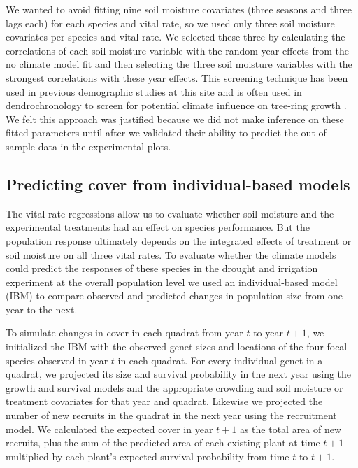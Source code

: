 \documentclass[11pt]{article}
\begin{document}
\begin{doublespace}
We wanted to avoid fitting nine soil moisture covariates (three seasons and three lags each) for each species and vital rate, so we used only three soil moisture covariates per species and vital rate. We selected these three by calculating the correlations of each soil moisture variable with the random year effects from the no climate model fit and then selecting the three soil moisture variables with the strongest correlations with these year effects. This screening technique has been used in previous demographic studies at this site \citep{dalgleish_climate_2010} and is often used in dendrochronology to screen for potential climate influence on tree-ring growth \citep{wang_temporal_2003}. We felt this approach was justified because we did not make inference on these fitted parameters until after we validated their ability to predict the out of sample data in the experimental plots. 

\subsection*{Predicting cover from individual-based models}

The vital rate regressions allow us to evaluate whether soil moisture and the experimental treatments had an effect on species performance. But the population response ultimately depends on the integrated effects of treatment or soil moisture on all three vital rates.  To evaluate whether the climate models could predict the responses of these species in the drought and irrigation experiment at the overall population level we used an individual-based model (IBM) to compare observed and predicted changes in population size from one year to the next. 

To simulate changes in cover in each quadrat from year $t$ to year $t+1$, we initialized the IBM with the observed genet sizes and locations of the four focal species observed in year $t$ in each quadrat. For every individual genet in a quadrat, we projected its size and survival probability in the next year using the growth and survival models and the appropriate crowding and soil moisture or treatment covariates for that year and quadrat.  Likewise we projected the number of new recruits in the quadrat in the next year using the recruitment model. We calculated the expected cover in year $t+1$ as the total area of new recruits, plus the sum of the predicted area of each existing plant at time $t+1$ multiplied by each plant's expected survival probability from time $t$ to $t+1$. 


\end{doublespace}
\end{document}
